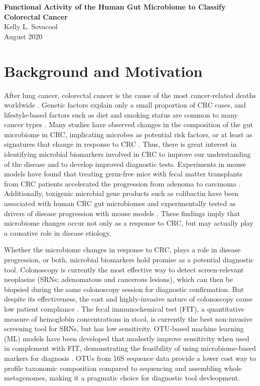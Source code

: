\documentclass[11pt]{article}
\begin{document}
\sloppy
\begin{center}
\large{\textbf{
    Functional Activity of the Human Gut Microbiome to Classify Colorectal Cancer
}} \\
\vspace{11pt}
\small{
    Kelly L. Sovacool \\
    August 2020
}
\end{center}



\section*{Background and Motivation} %

After lung cancer, colorectal cancer is the cause of the most cancer-related deaths worldwide \cite{ferlay_cancer_2015}.
Genetic factors explain only a small proportion of CRC cases, and lifestyle-based factors such as diet and smoking status are common to many cancer types \cite{thomas_metagenomic_2019}.
Many studies have observed changes in the composition of the gut microbiome in CRC, implicating microbes as potential risk factors, or at least as signatures that change in response to CRC \cite{kostic_genomic_2012, chen_decreased_2013}.
Thus, there is great interest in identifying microbial biomarkers involved in CRC to improve our understanding of the disease and to develop improved diagnostic tests.
Experiments in mouse models have found that treating germ-free mice with fecal matter transplants from CRC patients accelerated the progression from adenoma to carcinoma \cite{li_gut_2019, sobhani_colorectal_2019}.
Additionally, toxigenic microbial gene products such as colibactin have been associated with human CRC gut microbiomes and experimentally tested as drivers of disease progression with mouse models \cite{cougnoux_bacterial_2014, gagnaire_collateral_2017, thakur_unveiling_2019}.
These findings imply that microbiome changes occur not only as a response to CRC,
but may actually play a causative role in disease etiology.

Whether the microbiome changes in response to CRC, plays a role in disease progression, or both,
microbial biomarkers hold promise as a potential diagnostic tool.
Colonoscopy is currently the most effective way to detect screen-relevant neoplasias (SRNs; adenomatous and cancerous lesions),
which can then be biopsied during the same colonoscopy session for diagnostic confirmation.
But despite its effectiveness, the cost and highly-invasive nature of colonoscopy cause low patient compliance \cite{ling_attitudes_2001, jones_patient-reported_2010}.
The fecal immunochemical test (FIT), a quantitative measure of hemoglobin concentrations in stool,
is currently the best non-invasive screening tool for SRNs, but has low sensitivity.
OTU-based machine learning (ML) models have been developed that modestly improve sensitivity when used in complement with FIT, demonstrating the feasibility of using microbiome-based markers for diagnosis \cite{baxter_microbiota-based_2016}.
OTUs from 16S sequence data provide a lower cost way to profile taxonomic composition compared to sequencing and assembling whole metagenomes, making it a pragmatic choice for diagnostic tool devleopment.
\end{document}
